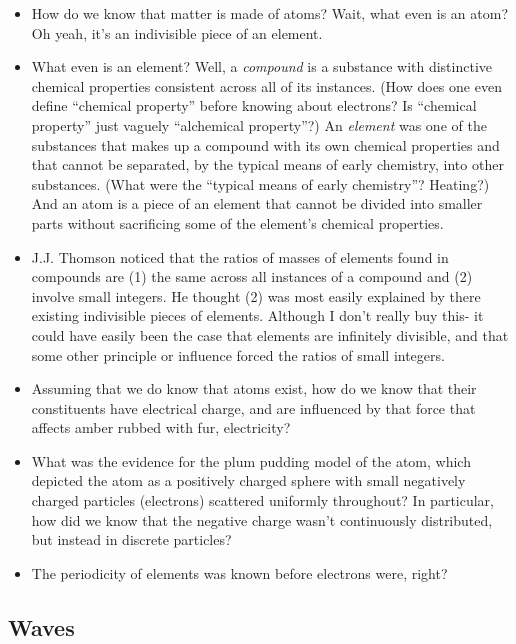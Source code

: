 \documentclass{article}
\begin{document}
\begin{itemize}
	\item How do we know that matter is made of atoms? Wait, what even is an atom? Oh yeah, it's an indivisible piece of an element.
	\item What even is an element? Well, a \textit{compound} is a substance with distinctive chemical properties consistent across all of its instances. (How does one even define ``chemical property'' before knowing about electrons? Is ``chemical property'' just vaguely ``alchemical property''?) An \textit{element} was one of the substances that makes up a compound with its own chemical properties and that cannot be separated, by the typical means of early chemistry, into other substances. (What were the ``typical means of early chemistry''? Heating?) And an atom is a piece of an element that cannot be divided into smaller parts without sacrificing some of the element's chemical properties.
	\item J.J. Thomson noticed that the ratios of masses of elements found in compounds are (1) the same across all instances of a compound and (2) involve small integers. He thought (2) was most easily explained by there existing indivisible pieces of elements. Although I don't really buy this- it could have easily been the case that elements are infinitely divisible, and that some other principle or influence forced the ratios of small integers.
	\item Assuming that we do know that atoms exist, how do we know that their constituents have electrical charge, and are influenced by that force that affects amber rubbed with fur, electricity?
	\item What was the evidence for the plum pudding model of the atom, which depicted the atom as a positively charged sphere with small negatively charged particles (electrons) scattered uniformly throughout? In particular, how did we know that the negative charge wasn't continuously distributed, but instead in discrete particles?
\end{itemize}

\begin{itemize}
	\item The periodicity of elements was known before electrons were, right?
\end{itemize}

\subsection*{Waves}
\end{document}
